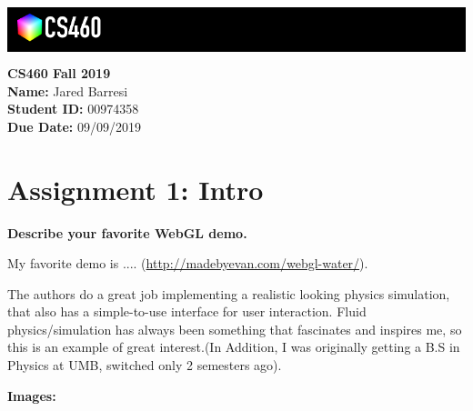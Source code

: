 \documentclass[10pt,oneside,onecolumn,letterpaper]{article}
\begin{document}
\noindent\colorbox{black}{
\begin{minipage}[c]{.99\linewidth}
  \vspace{.4cm}
  \Large{}
  \begin{flushright}
    \vspace{-1.2cm}
    \includegraphics[width=3cm]{gfx/cs460.png}
  \end{flushright}
\end{minipage}
}


\vspace{.5cm} %

\noindent\textbf{CS460 Fall 2019} \\
\textbf{Name:} Jared Barresi \\
\textbf{Student ID:} 00974358 \\
\textbf{Due Date:} 09/09/2019

\section*{Assignment 1: Intro}

\textbf{Describe your favorite WebGL demo.}

\vspace{.5cm} %

\noindent My favorite demo is .... (\url{http://madebyevan.com/webgl-water/}). 

\vspace{.5cm}

\noindent The authors do a great job implementing a realistic looking physics simulation, that also has a simple-to-use interface for user interaction. Fluid physics/simulation has always been something that fascinates and inspires me, so this is an example of great interest.(In Addition, I was originally getting a B.S in Physics at UMB, switched only 2 semesters ago).

\vspace{.5cm} %

\noindent\textbf{Images:}

\newline
\end{document}
